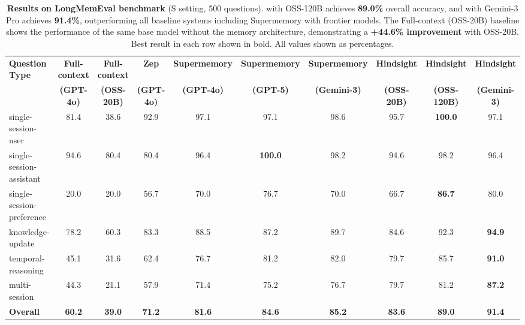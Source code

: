 \begin{table}[!t]
\centering
\renewcommand{\arraystretch}{1.3}
\begin{adjustbox}{max width=\textwidth}
\begin{tabular}{l|cc|cccc|ccc}
\hline
\textbf{Question Type} & 
\textbf{Full-context} & 
\textbf{Full-context} & 
\textbf{Zep} & 
\textbf{Supermemory} & 
\textbf{Supermemory} & 
\textbf{Supermemory} & 
\textbf{Hindsight} & 
\textbf{Hindsight} & 
\textbf{Hindsight} \\

& 
\textbf{(GPT-4o)} & 
\textbf{(OSS-20B)} & 
\textbf{(GPT-4o)} & 
\textbf{(GPT-4o)} & 
\textbf{(GPT-5)} & 
\textbf{(Gemini-3)} & 
\textbf{(OSS-20B)} & 
\textbf{(OSS-120B)} & 
\textbf{(Gemini-3)} \\
\hline
\hline
single-session-user & 81.4 & 38.6 & 92.9 & 97.1 & 97.1 & 98.6 & 95.7 & \textbf{100.0} & 97.1 \\
single-session-assistant & 94.6 & 80.4 & 80.4 & 96.4 & \textbf{100.0} & 98.2 & 94.6 & 98.2 & 96.4 \\
single-session-preference & 20.0 & 20.0 & 56.7 & 70.0 & 76.7 & 70.0 & 66.7 & \textbf{86.7} & 80.0 \\
knowledge-update & 78.2 & 60.3 & 83.3 & 88.5 & 87.2 & 89.7 & 84.6 & 92.3 & \textbf{94.9} \\
temporal-reasoning & 45.1 & 31.6 & 62.4 & 76.7 & 81.2 & 82.0 & 79.7 & 85.7 & \textbf{91.0} \\
multi-session & 44.3 & 21.1 & 57.9 & 71.4 & 75.2 & 76.7 & 79.7 & 81.2 & \textbf{87.2} \\
\hline
\textbf{Overall} & \textbf{60.2} & \textbf{39.0} & \textbf{71.2} & \textbf{81.6} & \textbf{84.6} & \textbf{85.2} & \textbf{83.6} & \textbf{89.0} & \textbf{91.4} \\
\hline
\end{tabular}
\end{adjustbox}
\caption{\textbf{Results on LongMemEval benchmark} (S setting, 500 questions). \our with OSS-120B achieves \textbf{89.0\%} overall accuracy, and with Gemini-3 Pro achieves \textbf{91.4\%}, outperforming all baseline systems including Supermemory with frontier models. The Full-context (OSS-20B) baseline shows the performance of the same base model without the \our memory architecture, demonstrating a \textbf{+44.6\% improvement} with OSS-20B. Best result in each row shown in bold. All values shown as percentages.}
\label{tab:longmemeval_results}
\end{table}

